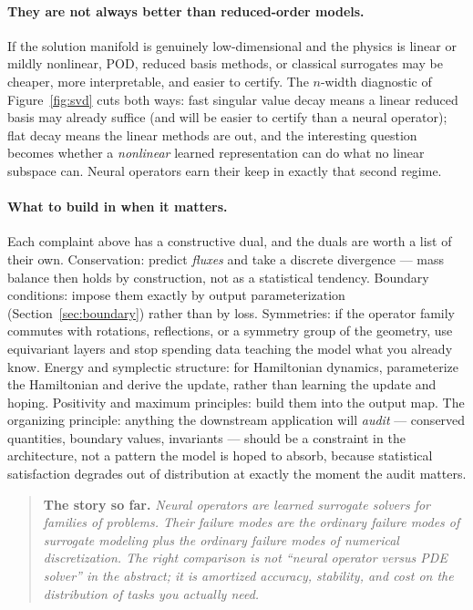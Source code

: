 \documentclass[10pt,a4paper]{article}
\newenvironment{recap}
{\par\medskip\noindent\begin{quote}\small\textbf{The story so far.}\itshape\;}
{\end{quote}\medskip}
\begin{document}
\paragraph{They are not always better than reduced-order models.}
If the solution manifold is genuinely low-dimensional and the physics is
linear or mildly nonlinear, POD, reduced basis methods, or classical
surrogates may be cheaper, more interpretable, and easier to certify. The
$n$-width diagnostic of Figure~\ref{fig:svd} cuts both ways: fast singular
value decay means a linear reduced basis may already suffice (and will be
easier to certify than a neural operator); flat decay means the linear
methods are out, and the interesting question becomes whether a
\emph{nonlinear} learned representation can do what no linear subspace
can. Neural operators earn their keep in exactly that second regime.

\paragraph{What to build in when it matters.}
Each complaint above has a constructive dual, and the duals are worth a
list of their own. Conservation: predict \emph{fluxes} and take a
discrete divergence --- mass balance then holds by construction, not as a
statistical tendency. Boundary conditions: impose them exactly by output
parameterization (Section~\ref{sec:boundary}) rather than by loss.
Symmetries: if the operator family commutes with rotations, reflections,
or a symmetry group of the geometry, use equivariant layers and stop
spending data teaching the model what you already know. Energy and
symplectic structure: for Hamiltonian dynamics, parameterize the
Hamiltonian and derive the update, rather than learning the update and
hoping. Positivity and maximum principles: build them into the output
map. The organizing principle: anything the downstream application will
\emph{audit} --- conserved quantities, boundary values, invariants ---
should be a constraint in the architecture, not a pattern the model is
hoped to absorb, because statistical satisfaction degrades out of
distribution at exactly the moment the audit matters.

\begin{recap}
Neural operators are learned surrogate solvers for families of problems. Their
failure modes are the ordinary failure modes of surrogate modeling plus the
ordinary failure modes of numerical discretization. The right comparison is
not ``neural operator versus PDE solver'' in the abstract; it is amortized
accuracy, stability, and cost on the distribution of tasks you actually need.
\end{recap}
\end{document}
